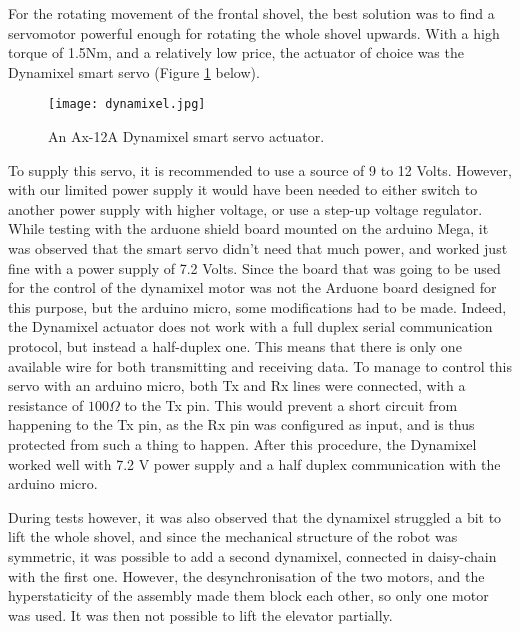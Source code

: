 For the rotating movement of the frontal shovel, the best solution was to find a servomotor powerful enough for rotating the whole shovel upwards. With a high torque of 1.5Nm, and a relatively low price, the actuator of choice was the Dynamixel smart servo (Figure \ref{fig:dynamixel} below). 

\begin{figure}[H]
  \centering
  \texttt{[image: dynamixel.jpg]}
  \caption{An Ax-12A Dynamixel smart servo actuator.}
\label{fig:dynamixel}
\end{figure}

To supply this servo, it is recommended to use a source of 9 to 12 Volts. However, with our limited power supply it would have been needed to either switch to another power supply with higher voltage, or use a step-up voltage regulator. While testing with the arduone shield board mounted on the arduino Mega, it was observed that the smart servo didn't need that much power, and worked just fine with a power supply of 7.2 Volts. Since the board that was going to be used for the control of the dynamixel motor was not the Arduone board designed for this purpose, but the arduino micro, some modifications had to be made. Indeed, the Dynamixel actuator does not work with a full duplex serial communication protocol, but instead a half-duplex one. This means that there is only one available wire for both transmitting and receiving data. To manage to control this servo with an arduino micro, both Tx and Rx lines were connected, with a resistance of $100 \Omega$ to the Tx pin. This would prevent a short circuit from happening to the Tx pin, as the Rx pin was configured as input, and is thus protected from such a thing to happen. After this procedure, the Dynamixel worked well with 7.2 V power supply and a half duplex communication with the arduino micro.

During tests however, it was also observed that the dynamixel struggled a bit to lift the whole shovel, and since the mechanical structure of the robot was symmetric, it was possible to add a second dynamixel, connected in daisy-chain with the first one. However, the desynchronisation of the two motors, and the hyperstaticity of the assembly made them block each other, so only one motor was used. It was then not possible to lift the elevator partially.
